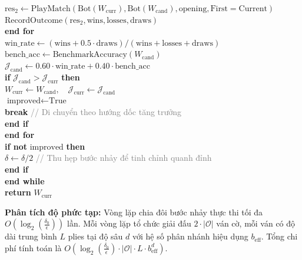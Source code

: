 \documentclass[11pt,a4paper]{article}
\begin{document}
\begin{tcolorbox}
\quad\quad\quad $\text{res}_2 \leftarrow \text{PlayMatch}(\text{Bot}(W_{\text{curr}}), \text{Bot}(W_{\text{cand}}), \text{opening}, \text{First}=\text{Current})$\\
\quad\quad\quad $\text{RecordOutcome}(\text{res}_2, \text{wins}, \text{losses}, \text{draws})$\\
\quad\quad \textbf{end for}\\
\quad\quad $\text{win\_rate} \leftarrow (\text{wins} + 0.5 \cdot \text{draws}) / (\text{wins} + \text{losses} + \text{draws})$\\
\quad\quad $\text{bench\_acc} \leftarrow \text{BenchmarkAccuracy}(W_{\text{cand}})$\\
\quad\quad $\mathcal{J}_{\text{cand}} \leftarrow 0.60 \cdot \text{win\_rate} + 0.40 \cdot \text{bench\_acc}$\\
\quad\quad \textbf{if} $\mathcal{J}_{\text{cand}} > \mathcal{J}_{\text{curr}}$ \textbf{then}\\
\quad\quad\quad $W_{\text{curr}} \leftarrow W_{\text{cand}}, \quad \mathcal{J}_{\text{curr}} \leftarrow \mathcal{J}_{\text{cand}}$\\
\quad\quad\quad $\text{improved} \leftarrow \text{True}$\\
\quad\quad\quad \textbf{break} \hfill\textcolor{gray}{// Di chuyển theo hướng dốc tăng trưởng}\\
\quad\quad \textbf{end if}\\
\quad \textbf{end for}\\
\quad \textbf{if not} $\text{improved}$ \textbf{then}\\
\quad\quad $\delta \leftarrow \delta / 2$ \hfill\textcolor{gray}{// Thu hẹp bước nhảy để tinh chỉnh quanh đỉnh}\\
\quad \textbf{end if}\\
\textbf{end while}\\
\textbf{return} $W_{\text{curr}}$
\end{tcolorbox}

\textbf{Phân tích độ phức tạp:} Vòng lặp chia đôi bước nhảy thực thi tối đa $O\left(\log_2\left(\frac{\delta_0}{\epsilon}\right)\right)$ lần. Mỗi vòng lặp tổ chức giải đấu $2 \cdot |\mathcal{O}|$ ván cờ, mỗi ván có độ dài trung bình $L$ plies tại độ sâu $d$ với hệ số phân nhánh hiệu dụng $b_{\text{eff}}$. Tổng chi phí tính toán là $O\left(\log_2\left(\frac{\delta_0}{\epsilon}\right) \cdot |\mathcal{O}| \cdot L \cdot b_{\text{eff}}^d\right)$.

\FloatBarrier
\end{document}
